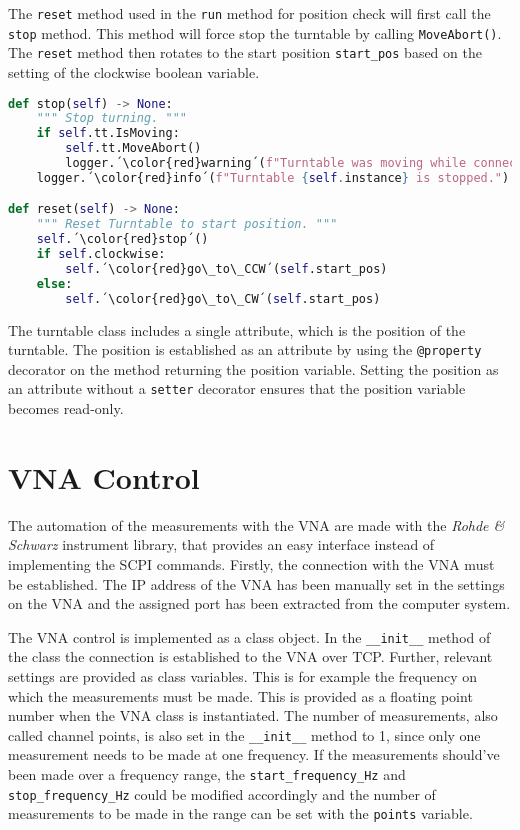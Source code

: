 The \verb+reset+ method used in the \verb+run+ method for position check will first call the \verb+stop+ method. This method will force stop the turntable by calling \verb+MoveAbort()+. The \verb+reset+ method then rotates  to the start position \verb+start_pos+ based on the setting of the clockwise boolean variable.

\begin{lstlisting}[language=Python, caption=Method for resetting the turntable to start position.]
def stop(self) -> None:
    """ Stop turning. """
    if self.tt.IsMoving:
        self.tt.MoveAbort()
        logger.´\color{red}warning´(f"Turntable was moving while connection was stopped for {self.instance}.")
    logger.´\color{red}info´(f"Turntable {self.instance} is stopped.")

def reset(self) -> None:
    """ Reset Turntable to start position. """
    self.´\color{red}stop´()
    if self.clockwise:
        self.´\color{red}go\_to\_CCW´(self.start_pos)
    else:
        self.´\color{red}go\_to\_CW´(self.start_pos)
\end{lstlisting}

The turntable class includes a single attribute, which is the position of the turntable. The position is established as an attribute by using the \verb+@property+ decorator on the method returning the position variable. Setting the position as an attribute without a \verb+setter+ decorator ensures that the position variable becomes read-only. 

\section{VNA Control}
The automation of the measurements with the VNA are made with the \textit{Rohde \& Schwarz} instrument library, that provides an easy interface instead of implementing the SCPI commands. Firstly, the connection with the VNA must be established. The IP address of the VNA has been manually set in the settings on the VNA and the assigned port has been extracted from the computer system. 

The VNA control is implemented as a class object. In the \verb+__init__+ method of the class the connection is established to the VNA over TCP. Further, relevant settings are provided as class variables. This is for example the frequency on which the measurements must be made. This is provided as a floating point number when the VNA class is instantiated. The number of measurements, also called channel points, is also set in the \verb+__init__+ method to 1, since only one measurement needs to be made at one frequency. If the measurements should've been made over a frequency range, the \verb+start_frequency_Hz+ and \verb+stop_frequency_Hz+ could be modified accordingly and the number of measurements to be made in the range can be set with the \verb+points+ variable.

